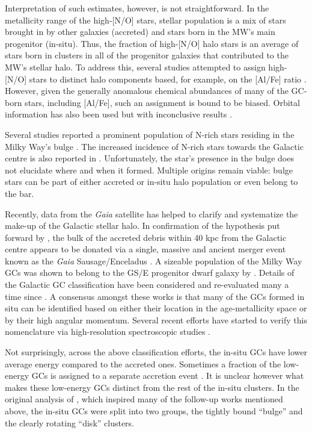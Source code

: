 \documentclass[a4paper,useAMS,usenatbib]{mnras}
\begin{document}
Interpretation of such estimates, however, is not straightforward.  In the metallicity range of the high-[N/O] stars, stellar population is a mix of stars brought in by other galaxies (accreted) and stars born in the MW's main progenitor (in-situ). Thus, the fraction of high-[N/O] halo stars is an average of stars born in clusters in all of the progenitor galaxies that contributed to the MW's stellar halo.  To address this, several studies attempted to assign high-[N/O] stars to distinct halo components based, for example, on the [Al/Fe] ratio \citep[][]{Kisku2021,Fernandez_Trincado2022}. However, given the generally anomalous chemical abundances of many of the GC-born stars, including [Al/Fe], such an assignment is bound to be biased. Orbital information has also been used but with inconclusive results \citep[][]{Trincado2020c,Tang2020,Fernandez_Trincado2022}. 

Several studies reported a prominent population of N-rich stars residing in the Milky Way's bulge \citep[see][]{Schiavon2017,Jurassic}. The increased incidence of N-rich stars towards the Galactic centre is also reported in \citet{Horta2021}. Unfortunately, the star's presence in the bulge does not elucidate where and when it formed. Multiple origins remain viable: bulge stars can be part of either accreted or in-situ halo population or even belong to the bar. 

Recently, data from the {\it Gaia} satellite has helped to clarify and systematize the make-up of the Galactic stellar halo. In confirmation of the hypothesis put forward by \citet{Deason2013}, the bulk of the accreted debris within 40 kpc from the Galactic centre appears to be donated via a single, massive and ancient merger event known as the {\it Gaia} Sausage/Enceladus \citep[GS/E,][]{Belokurov2018,Helmi2018}. A sizeable population of the Milky Way GCs was shown to belong to the GS/E progenitor dwarf galaxy by \citet{Myeong2018}. Details of the Galactic GC classification have been considered and re-evaluated many a time since \citep[e.g.,][]{Massari2019, Krujssen2019, Myeong2019,Forbes2020,Callingham2022}. A consensus amongst these works is that many of the GCs formed in situ can be identified based on either their location in the age-metallicity space or by their high angular momentum. Several recent efforts have started to verify this nomenclature via high-resolution spectroscopic studies \citep[e.g.][]{Koch-Hansen2021,McKenzie2022,Monty2023}.

Not surprisingly, across the above classification efforts, the in-situ GCs have lower average energy compared to the accreted ones. Sometimes a fraction of the low-energy GCs is assigned to a separate accretion event \citep[][]{Massari2019, Forbes2020, Krijssen2020, Callingham2022}. It is unclear however what makes these low-energy GCs distinct from the rest of the in-situ clusters. In the original analysis of \citet{Massari2019}, which inspired many of the follow-up works mentioned above, the in-situ GCs were split into two groups, the tightly bound ``bulge'' and the clearly rotating ``disk'' clusters. 
\end{document}
